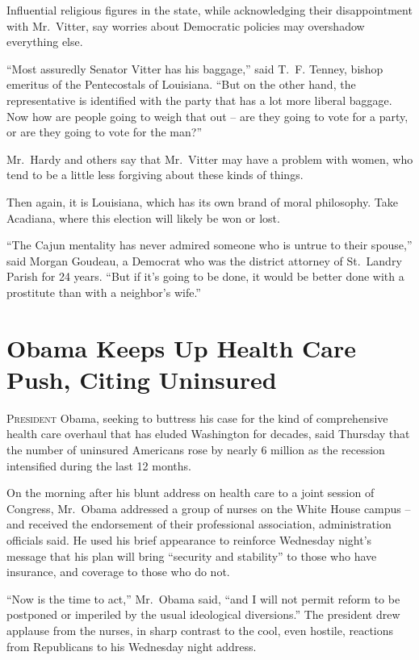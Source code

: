 ﻿\documentclass[12pt]{article}
\begin{document}
Influential religious figures in the state, while acknowledging their disappointment with
Mr.~Vitter, say worries about Democratic policies may overshadow everything else.

``Most assuredly Senator Vitter has his baggage,'' said T.~F. Tenney, bishop emeritus of the
Pentecostals of Louisiana. ``But on the other hand, the representative is identified with the party
that has a lot more liberal baggage. Now how are people going to weigh that out -- are they going to
vote for a party, or are they going to vote for the man?''

Mr.~Hardy and others say that Mr.~Vitter may have a problem with women, who tend to be a little less
forgiving about these kinds of things.

Then again, it is Louisiana, which has its own brand of moral philosophy. Take Acadiana, where this
election will likely be won or lost.

``The Cajun mentality has never admired someone who is untrue to their spouse,'' said Morgan
Goudeau, a Democrat who was the district attorney of St.~Landry Parish for 24 years. ``But if it's
going to be done, it would be better done with a prostitute than with a neighbor's wife.''

\section{Obama Keeps Up Health Care Push, Citing Uninsured}

\lettrine{P}{resident} Obama, seeking to buttress his case for the kind of comprehensive health care
overhaul that has eluded Washington for decades, said Thursday that the number of uninsured
Americans rose by nearly 6 million as the recession intensified during the last 12 months.

On the morning after his blunt address on health care to a joint session of Congress, Mr.~Obama
addressed a group of nurses on the White House campus -- and received the endorsement of their
professional association, administration officials said. He used his brief appearance to reinforce
Wednesday night's message that his plan will bring ``security and stability'' to those who have
insurance, and coverage to those who do not.

``Now is the time to act,'' Mr.~Obama said, ``and I will not permit reform to be postponed or
imperiled by the usual ideological diversions.'' The president drew applause from the nurses, in
sharp contrast to the cool, even hostile, reactions from Republicans to his Wednesday night address.
\end{document}
